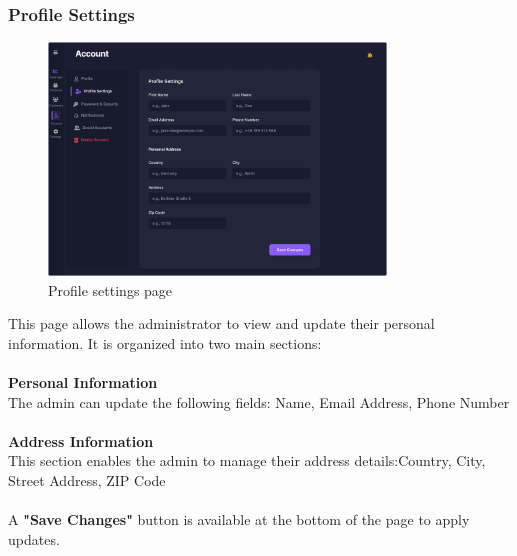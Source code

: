 \documentclass[12pt]{article}
\begin{document}
	\subsubsection{Profile Settings}
	\begin{figure}[H]
		\centering
		\includegraphics[width=0.8\textwidth]{pictures/admin/ProfileSettings_Admin}
		\caption{Profile settings page}\label{fig:figure5}
	\end{figure}
	This page allows the administrator to view and update their personal information.
	It is organized into two main sections: \\ \\
	\textbf{Personal Information} \\
	The admin can update the following fields: Name, Email Address, Phone Number \\ \\
	\textbf{Address Information} \\
	This section enables the admin to manage their address details:Country, City, Street Address, ZIP Code \\ \\
	A \textbf{"Save Changes"} button is available at the bottom of the page to apply updates.
\end{document}
